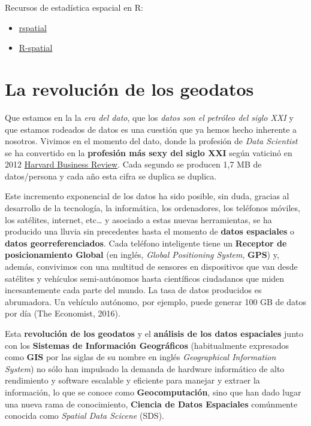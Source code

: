 \documentclass[
]{book}
\providecommand{\tightlist}{%
  \setlength{\itemsep}{0pt}\setlength{\parskip}{0pt}}
\theoremstyle{definition}
\theoremstyle{definition}
\theoremstyle{definition}
\theoremstyle{definition}
\theoremstyle{remark}
\begin{document}
Recursos de estadística espacial en R:

\begin{itemize}
\tightlist
\item
  \href{https://rspatial.org/}{rspatial}
\item
  \href{https://r-spatial.org/projects/}{R-spatial}
\end{itemize}

\hypertarget{la-revoluciuxf3n-de-los-geodatos}{%
\chapter{La revolución de los geodatos}\label{la-revoluciuxf3n-de-los-geodatos}}

Que estamos en la la \emph{era del dato}, que los \emph{datos son el petróleo del siglo
XXI} y que estamos rodeados de datos es una cuestión que ya hemos hecho
inherente a nosotros. Vivimos en el momento del dato, donde la profesión de
\emph{Data Scientist} se ha convertido en la \textbf{profesión más sexy del siglo XXI}
según vaticinó en 2012 \href{https://hbr.org/2012/10/data-scientist-the-sexiest-job-of-the-21st-century}{Harvard Business
Review}.
Cada segundo se producen 1,7 MB de datos/persona y cada año esta cifra se
duplica se duplica.

Este incremento exponencial de los datos ha sido posible, sin duda, gracias al
desarrollo de la tecnología, la informática, los ordenadores, los teléfonos
móviles, los satélites, internet, etc\ldots{} y asociado a estas nuevas herramientas,
se ha producido una lluvia sin precedentes hasta el momento de \textbf{datos
espaciales} o \textbf{datos georreferenciados}. Cada teléfono inteligente tiene un
\textbf{Receptor de posicionamiento Global} (en inglés, \emph{Global Positioning System},
\textbf{GPS}) y, además, convivimos con una multitud de sensores en dispositivos que
van desde satélites y vehículos semi-autónomos hasta científicos ciudadanos que
miden incesantemente cada parte del mundo. La tasa de datos producidos es
abrumadora. Un vehículo autónomo, por ejemplo, puede generar 100 GB de datos por
día (The Economist, 2016).

Esta \textbf{revolución de los geodatos} y el \textbf{análisis de los datos espaciales}
junto con los \textbf{Sistemas de Información Geográficos} (habitualmente expresados
como \textbf{GIS} por las siglas de su nombre en inglés \emph{Geographical Information
System}) no sólo han impulsado la demanda de hardware informático de alto
rendimiento y software escalable y eficiente para manejar y extraer la
información, lo que se conoce como \textbf{Geocomputación}, sino que han dado lugar
una nueva rama de conocimiento, \textbf{Ciencia de Datos Espaciales} comúnmente
conocida como \emph{Spatial Data Scicene} (SDS).
\end{document}
